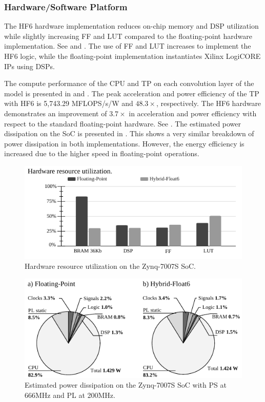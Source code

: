 \subsubsection{Hardware/Software Platform}
The HF6 hardware implementation reduces on-chip memory and DSP utilization while slightly increasing FF and LUT compared to the floating-point hardware implementation. See  and . The use of FF and LUT increases to implement the HF6 logic, while the floating-point implementation instantiates Xilinx LogiCORE IPs using DSPs.

The compute performance of the CPU and TP on each convolution layer of the model is presented in  and . The peak acceleration and power efficiency of the TP with HF6 is 5,743.29 MFLOPS/s/W and $48.3\times$, respectively. The HF6 hardware demonstrates an improvement of $3.7\times$ in acceleration and power efficiency with respect to the standard floating-point hardware. See . The estimated power dissipation on the SoC is presented in . This shows a very similar breakdown of power dissipation in both implementations. However, the energy efficiency is increased due to the higher speed in floating-point operations.

\begin{figure}[h!]
	\centering
	\includegraphics[width=1\columnwidth]{../figures/power_breakdown/resource_utilization.pdf}
	\caption{Hardware resource utilization on the Zynq-7007S SoC.}
	\label{fig:resource_utilization}
\end{figure}

\begin{figure}[h!]
	\centering
	\includegraphics[width=1\columnwidth]{../figures/power_breakdown/power_breakdown.pdf}
	\caption{Estimated power dissipation on the Zynq-7007S SoC with PS at 666MHz and PL at 200MHz.}
	\label{fig:power}
\end{figure}

